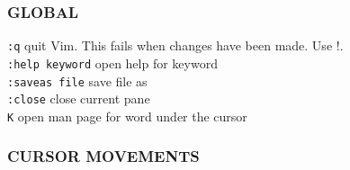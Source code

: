 \documentclass[10pt,a4paper,landscape]{article}
\begin{document}
\begin{multicols}{3}


  \subsubsection*{
    GLOBAL
    }
    
    \colorbox{gray!20}{\lstinline{:q}}                  quit Vim. This fails when changes have been made. Use !. \\
    \colorbox{gray!20}{\lstinline{:help keyword}}       open help for keyword \\
    \colorbox{gray!20}{\lstinline{:saveas file}}        save file as \\
    \colorbox{gray!20}{\lstinline{:close}}              close current pane \\
    \colorbox{gray!20}{\lstinline{K}}                   open man page for word under the cursor \\
    
    \subsubsection*{
    CURSOR MOVEMENTS
    }
    

\end{multicols}
\end{document}
